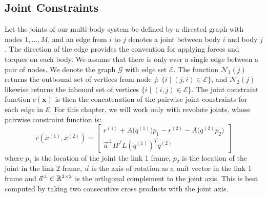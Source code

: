 \documentclass[../root.tex]{subfiles}
\begin{document}
\subsection{Joint Constraints}
Let the joints of our multi-body system be defined by a directed graph with nodes $1,\dots,M$,
and an edge from $i$ to $j$ denotes a joint between body $i$ and body $j$. The direction 
of the edge provides the convention for applying forces and torques on each body. We assume 
that there is only ever a single edge between a pair of nodes. We denote the graph 
$\mathcal{G}$ with edge set $\mathcal{E}$. The function $\mathcal{N}_1(j)$ returns the
outbound set of vertices from node $j$: $\{i \mid (j,i) \in \mathcal{E}\}$, 
and $\mathcal{N}_2(j)$ likewise returns the inbound set of vertices 
$\{ i \mid (i,j) \in \mathcal{E}\}$. The joint constraint function $c(\mathbf{x})$ is then 
the concatenation of the pairwise joint constraints for each edge in $\mathcal{E}$. For 
this chapter, we will work only with revolute joints, whose pairwise constraint function is:
\begin{equation}
    c(x^{(1)}, x^{(2)}) = \begin{bmatrix}
        r^{(1)} + A \big( q^{(1)} \big) p_1 - r^{(2)} - A \big( q^{(2)} p_2 \big) \\
        \vec{a}^\perp H^T L(q^{(1)})^T q^{(2)}
    \end{bmatrix}
\end{equation}
where $p_1$ is the location of the joint the link 1 frame, $p_2$ is the location of the 
joint in the link 2 frame, $\vec{a}$ is the axis of rotation as a unit vector in the 
link 1 frame and $\vec{a}^\perp \in \mathbb{R}^{2 \times 3}$ is the orthgonal complement to the 
joint axis. This is best computed by taking two consecutive cross products with the joint 
axis. 
\end{document}
